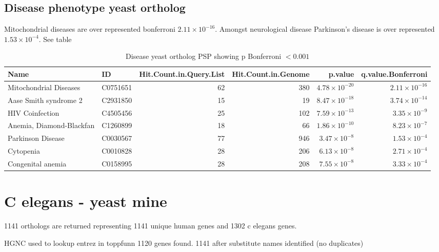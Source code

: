 \subsection{Disease phenotype yeast ortholog}

Mitochondrial diseases are over represented bonferroni $2.11 \times 10^{-16}$. Amongst neurological disease Parkinson's disease is over represented  $1.53 \times 10^{-4}$. See table 
\begin{table}[ht]
\centering
\begin{adjustbox}{width=1\textwidth}
\begin{tabular}{llrrrr}
  \hline
Name & ID & Hit.Count.in.Query.List & Hit.Count.in.Genome & p.value & q.value.Bonferroni \\ 
  \hline
Mitochondrial Diseases & C0751651 & 62 & 380 & $4.78 \times 10^{-20}$ & $2.11 \times 10^{-16}$ \\ 
  Aase Smith syndrome 2 & C2931850 & 15 & 19 & $8.47 \times 10^{-18}$ & $3.74 \times 10^{-14}$ \\ 
  HIV Coinfection & C4505456 & 25 & 102 & $7.59 \times 10^{-13}$ & $3.35 \times 10^{-9}$ \\ 
  Anemia, Diamond-Blackfan & C1260899 & 18 & 66 & $1.86 \times 10^{-10}$ & $8.23 \times 10^{-7}$ \\ 
  Parkinson Disease & C0030567 & 77 & 946 & $3.47 \times 10^{-8}$ & $1.53 \times 10^{-4}$ \\ 
  Cytopenia & C0010828 & 28 & 206 & $6.13 \times 10^{-8}$ & $2.71 \times 10^{-4}$ \\ 
  Congenital anemia & C0158995 & 28 & 208 & $7.55 \times 10^{-8}$ & $3.33 \times 10^{-4}$ \\ 
   \hline
\end{tabular}
\end{adjustbox}
\caption{Disease yeast ortholog PSP showing p Bonferroni $< 0.001$} 
\label{Table:Disease yeast ortholog PSP showing p Bonferroni < 0.001}
\end{table}

\section{C elegans - yeast mine}

1141 orthologs are returned representing 1141 unique human genes and 1302 c elegans genes. 

HGNC used to lookup entrez in toppfunn 1120 genes found. 1141 after substitute names identified (no duplicates)

